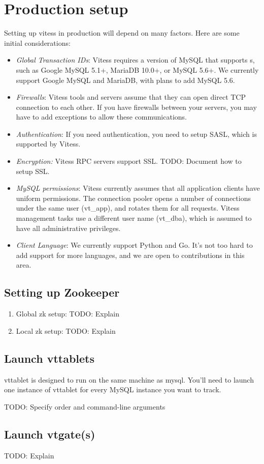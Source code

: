 \section{Production setup}\label{Production-Setup}

Setting up vitess in production will depend on many factors.
Here are some initial considerations:
\begin{itemize}
\item \emph{Global Transaction IDs}: Vitess requires a version of MySQL that supports s, such as Google MySQL 5.1+, MariaDB 10.0+, or MySQL 5.6+. We currently support Google MySQL and MariaDB, with plans to add MySQL 5.6.
\item \emph{Firewalls}: Vitess tools and servers assume that they can open direct TCP connection to each other. If you have firewalls between your servers, you may have to add exceptions to allow these communications.
\item \emph{Authentication}: If you need authentication, you need to setup SASL, which is supported by Vitess.
\item \emph{Encryption:} Vitess RPC servers support SSL. TODO: Document how to setup SSL.
\item \emph{MySQL permissions}: Vitess currently assumes that all
application clients have uniform permissions.
The connection pooler opens a number of connections under
the same user (vt\_app), and rotates them for all requests.
Vitess management tasks use a different user name (vt\_dba),
which is assumed to have all administrative privileges.
\item \emph{Client Language}: We currently support
      Python and Go.
It's not too hard to add support for more languages,
and we are open to contributions in this area.
\end{itemize}

\subsection{Setting up Zookeeper}\hypertarget{setting-up-zookeeper}{}\label{setting-up-zookeeper}
\begin{enumerate}
\item Global zk setup:
TODO: Explain
\item Local zk setup:
TODO: Explain
\end{enumerate}
\subsection{Launch vttablets}\hypertarget{launch-vttablets}{}\label{launch-vttablets}

vttablet is designed to run on the same machine as mysql.
You'll need to launch one instance of vttablet for every MySQL instance you want to track.

TODO: Specify order and command-line arguments

\subsection{Launch vtgate(s)}\hypertarget{launch-vtgates}{}\label{launch-vtgates}

TODO: Explain

